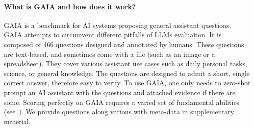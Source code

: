 \documentclass{fairmeta}
\newcommand{\benchmark}{\textsc{GAIA}}
\newcommand{\total}{466}
\begin{document}
\paragraph{What is \benchmark{} and how does it work?} \benchmark{} is a benchmark for AI systems proposing general assistant questions. \benchmark{} attempts to circumvent different pitfalls of LLMs evaluation. It is composed of \total{} questions designed and annotated by humans. These questions are text-based, and sometimes come with a file (such as an image or a spreadsheet). They cover various assistant use cases such as daily personal tasks, science, or general knowledge. The questions are designed to admit a short, single correct answer, therefore easy to verify. To use \benchmark{}, one only needs to zero-shot prompt an AI assistant with the questions and attached evidence if there are some.
Scoring perfectly on \benchmark{} requires a varied set of fundamental abilities (see~). We provide questions along various with meta-data in supplementary material.
\end{document}
